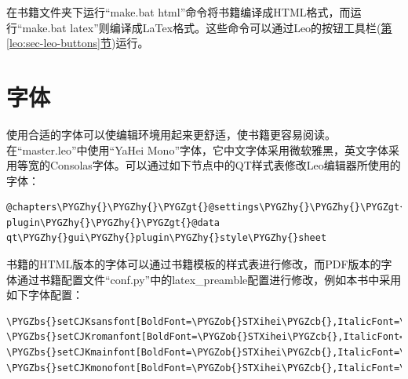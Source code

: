 \documentclass[letterpaper,10pt]{sphinxmanual}
\def\PYGZbs{\char`\\}
\def\PYGZob{\char`\{}
\def\PYGZcb{\char`\}}
\def\PYGZgt{\char`\>}
\def\PYGZhy{\char`\-}
\begin{document}
在书籍文件夹下运行“make.bat html”命令将书籍编译成HTML格式，而运行“make.bat latex”则编译成LaTex格式。这些命令可以通过Leo的按钮工具栏({\hyperref[leo:sec-leo-buttons]{第\ref*{leo:sec-leo-buttons}节}})运行。


\section{字体}
\label{setup:id3}
使用合适的字体可以使编辑环境用起来更舒适，使书籍更容易阅读。在“master.leo”中使用“YaHei Mono”字体，它中文字体采用微软雅黑，英文字体采用等宽的Consolas字体。可以通过如下节点中的QT样式表修改Leo编辑器所使用的字体：

\begin{Verbatim}[commandchars=\\\{\}]
@chapters\PYGZhy{}\PYGZhy{}\PYGZgt{}@settings\PYGZhy{}\PYGZhy{}\PYGZgt{}qtGui plugin\PYGZhy{}\PYGZhy{}\PYGZgt{}@data qt\PYGZhy{}gui\PYGZhy{}plugin\PYGZhy{}style\PYGZhy{}sheet
\end{Verbatim}

书籍的HTML版本的字体可以通过书籍模板的样式表进行修改，而PDF版本的字体通过书籍配置文件“conf.py”中的latex\_preamble配置进行修改，例如本书中采用如下字体配置：

\begin{Verbatim}[commandchars=\\\{\}]
\PYGZbs{}setCJKsansfont[BoldFont=\PYGZob{}STXihei\PYGZcb{},ItalicFont=\PYGZob{}STXihei\PYGZcb{}]\PYGZob{}STXihei\PYGZcb{}
\PYGZbs{}setCJKromanfont[BoldFont=\PYGZob{}STXihei\PYGZcb{},ItalicFont=\PYGZob{}STXihei\PYGZcb{}]\PYGZob{}STXihei\PYGZcb{}
\PYGZbs{}setCJKmainfont[BoldFont=\PYGZob{}STXihei\PYGZcb{},ItalicFont=\PYGZob{}STXihei\PYGZcb{}]\PYGZob{}STXihei\PYGZcb{}
\PYGZbs{}setCJKmonofont[BoldFont=\PYGZob{}STXihei\PYGZcb{},ItalicFont=\PYGZob{}STXihei\PYGZcb{}]\PYGZob{}STXihei\PYGZcb{}
\end{Verbatim}
\end{document}
